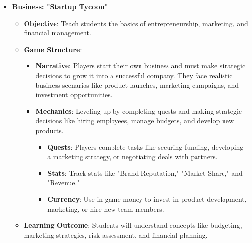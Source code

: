 \begin{itemize}
    \item \textbf{Business: "Startup Tycoon"}
    \begin{itemize}
        \item \textbf{Objective}: Teach students the basics of entrepreneurship, marketing, and financial management.
        \item \textbf{Game Structure}:
        \begin{itemize}
            \item \textbf{Narrative}: Players start their own business and must make strategic decisions to grow it into a successful company. They face realistic business scenarios like product launches, marketing campaigns, and investment opportunities.
            \item \textbf{Mechanics}: Leveling up by completing quests and making strategic decisions like hiring employees, manage budgets, and develop new products.
            \begin{itemize}
                \item \textbf{Quests}: Players complete tasks like securing funding, developing a marketing strategy, or negotiating deals with partners.
                \item \textbf{Stats}: Track stats like "Brand Reputation," "Market Share," and "Revenue."
                \item \textbf{Currency}: Use in-game money to invest in product development, marketing, or hire new team members.
            \end{itemize}
        \end{itemize}
        \item \textbf{Learning Outcome}: Students will understand concepts like budgeting, marketing strategies, risk assessment, and financial planning.
    \end{itemize}


\end{itemize}
